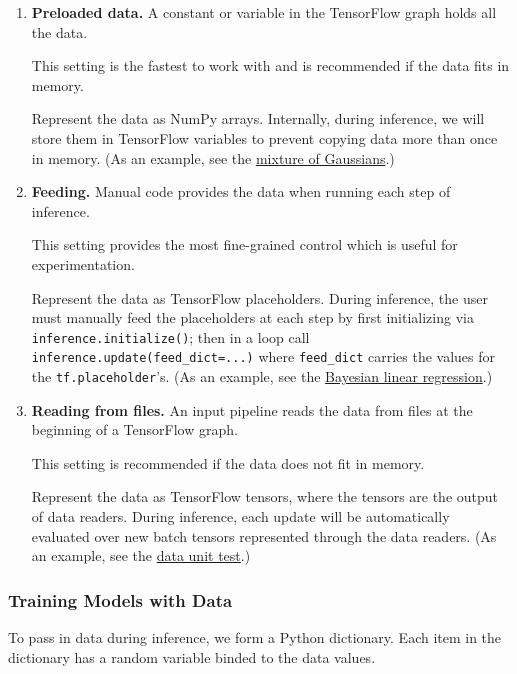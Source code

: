 \begin{enumerate}
\item
   \textbf{Preloaded data.} A constant or variable in the TensorFlow graph
   holds all the data.

   This setting is the fastest to work with and is recommended if the
   data fits in memory.

   Represent the data as NumPy arrays.
   Internally, during inference, we will store them in TensorFlow variables to prevent
   copying data more than once in memory.
   (As an example, see
   the
   \href{https://github.com/blei-lab/edward/blob/master/examples/tf_mixture_gaussian.py}
   {mixture of Gaussians}.)
\item
   \textbf{Feeding.} Manual code provides the data when running each step of
   inference.

   This setting provides the most fine-grained control which is useful for experimentation.

   Represent the data as TensorFlow placeholders. During inference,
   the user must manually feed the placeholders at each
   step by first initializing via \texttt{inference.initialize()}; then
   in a loop call \texttt{inference.update(feed_dict={...})} where
   \texttt{feed_dict} carries the values for the \texttt{tf.placeholder}'s.
   (As an example, see
   the
   \href{https://github.com/blei-lab/edward/blob/master/examples/bayesian_linear_regression.py}
   {Bayesian linear regression}.)
\item
   \textbf{Reading from files.} An input pipeline reads the data from files
   at the beginning of a TensorFlow graph.

   This setting is recommended if the data does not fit in memory.

   Represent the data as TensorFlow tensors, where the tensors are the
   output of data readers. During inference, each update will be
   automatically evaluated over new batch tensors represented through
   the data readers. (As an example, see
   the
   \href{https://github.com/blei-lab/edward/blob/master/tests/test_inference_data.py}
   {data unit test}.)
\end{enumerate}

\subsubsection{Training Models with Data}

To pass in data during inference, we form a Python dictionary. Each
item in the dictionary has a random variable binded to the data
values.

